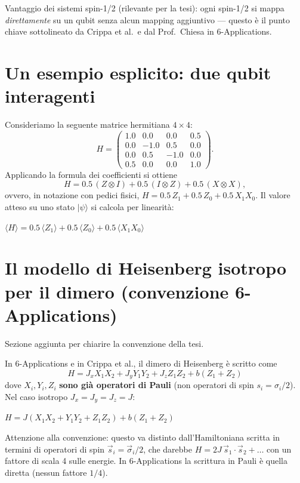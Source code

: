 \documentclass[11pt,a4paper]{article}
\begin{document}
\begin{editnote}
Vantaggio dei sistemi spin-1/2 (rilevante per la tesi): ogni spin-1/2 si
mappa \emph{direttamente} su un qubit senza alcun mapping aggiuntivo ---
questo è il punto chiave sottolineato da Crippa et al.\ e dal Prof.\
Chiesa in 6-Applications.
\end{editnote}

\section{Un esempio esplicito: due qubit interagenti}

Consideriamo la seguente matrice hermitiana $4\times4$:
$$H=\begin{pmatrix}1.0&0.0&0.0&0.5\\0.0&-1.0&0.5&0.0\\0.0&0.5&-1.0&0.0\\0.5&0.0&0.0&1.0\end{pmatrix}.$$
Applicando la formula dei coefficienti si ottiene
$$H = 0.5\,(Z\otimes I)+0.5\,(I\otimes Z)+0.5\,(X\otimes X),$$
ovvero, in notazione con pedici fisici, $H=0.5\,Z_1+0.5\,Z_0+0.5\,X_1X_0$.
Il valore atteso su uno stato $|\psi\rangle$ si calcola per linearità:
\begin{keyeq}
\centering
$\langle H\rangle = 0.5\,\langle Z_1\rangle+0.5\,\langle Z_0\rangle+0.5\,\langle X_1X_0\rangle$
\end{keyeq}

\section{Il modello di Heisenberg isotropo per il dimero (convenzione 6-Applications)}

\begin{editnote}
Sezione aggiunta per chiarire la convenzione della tesi.
\end{editnote}

In 6-Applications e in Crippa et al., il dimero di Heisenberg è scritto
come
$$H = J_xX_1X_2+J_yY_1Y_2+J_zZ_1Z_2+b(Z_1+Z_2)$$
dove $X_i,Y_i,Z_i$ \textbf{sono già operatori di Pauli} (non operatori
di spin $s_i=\sigma_i/2$). Nel caso isotropo $J_x=J_y=J_z=J$:
\begin{keyeq}
\centering
$H = J(X_1X_2+Y_1Y_2+Z_1Z_2)+b(Z_1+Z_2)$
\end{keyeq}

\begin{editnote}
Attenzione alla convenzione: questo va distinto dall'Hamiltoniana
scritta in termini di operatori di spin $\vec s_i=\vec\sigma_i/2$, che
darebbe $H=2J\,\vec s_1\cdot\vec s_2+\ldots$ con un fattore di scala 4
sulle energie. In 6-Applications la scrittura in Pauli è quella diretta
(nessun fattore $1/4$).
\end{editnote}
\end{document}
